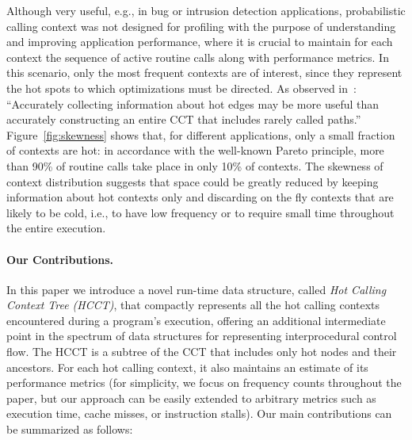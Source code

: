 \documentclass{sigplanconf}
\begin{document}
Although very useful, e.g., in bug or intrusion detection applications, probabilistic calling context was not designed for profiling with 
the purpose of understanding and improving application performance, where it is crucial to maintain for each context the sequence of active routine calls along with performance metrics. In this scenario, only the most frequent contexts are of interest, since they represent the hot spots to which optimizations must be directed. As observed in~\cite{ZSCC06}: ``Accurately collecting information about hot edges may be more useful than accurately constructing an entire CCT that includes rarely called paths.'' Figure~\ref{fig:skewness} shows that, for different applications, only a small fraction of contexts are hot: in accordance with the well-known Pareto principle, more than 90\% of routine calls take place in only 10\% of contexts. The skewness of context distribution suggests that space could be greatly reduced by keeping information about hot contexts only and discarding on the fly contexts that are likely to be cold, i.e., to have low frequency or to require small time throughout the entire execution. 

\paragraph{Our Contributions.} In this paper we introduce a novel run-time data structure, called {\em Hot Calling Context Tree (HCCT)}, that compactly represents all the hot calling contexts encountered during a program's execution, offering an additional intermediate point in the spectrum of data structures for representing interprocedural control flow. The HCCT is a subtree of the CCT that includes only hot nodes and their ancestors.
For each hot calling context, it also maintains an estimate of its performance metrics (for simplicity, we focus on frequency counts throughout the paper, but our approach can be easily extended to arbitrary metrics such as execution time, cache misses, or instruction stalls). Our main contributions can be summarized as follows:
\end{document}
